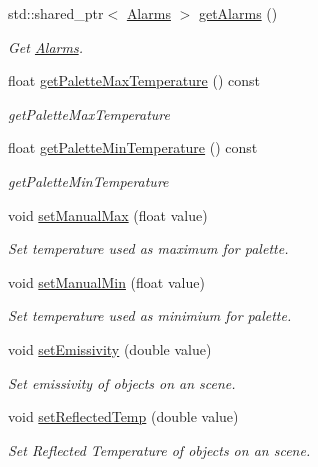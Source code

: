 \begin{DoxyCompactItemize}
std\+::shared\+\_\+ptr$<$ \hyperlink{classwtl_1_1_alarms}{Alarms} $>$ \hyperlink{classwtl_1_1_sequence_radiometric_a11b13d272a8674a3cdccfeb2ed3400fe}{get\+Alarms} ()
\begin{DoxyCompactList}\small\item\em Get \hyperlink{classwtl_1_1_alarms}{Alarms}. \end{DoxyCompactList}\item 
float \hyperlink{classwtl_1_1_sequence_radiometric_a3e944251c9a88be6f5b8cf5f41ffd462}{get\+Palette\+Max\+Temperature} () const
\begin{DoxyCompactList}\small\item\em get\+Palette\+Max\+Temperature \end{DoxyCompactList}\item 
float \hyperlink{classwtl_1_1_sequence_radiometric_a18e8bdc19c4d9e8794653da24db46b70}{get\+Palette\+Min\+Temperature} () const
\begin{DoxyCompactList}\small\item\em get\+Palette\+Min\+Temperature \end{DoxyCompactList}\item 
void \hyperlink{classwtl_1_1_sequence_radiometric_a7d1489f923aeffa694826ea063724251}{set\+Manual\+Max} (float value)
\begin{DoxyCompactList}\small\item\em Set temperature used as maximum for palette. \end{DoxyCompactList}\item 
void \hyperlink{classwtl_1_1_sequence_radiometric_ad5fc50b7c210bc5d2a914ba1c0b47a3c}{set\+Manual\+Min} (float value)
\begin{DoxyCompactList}\small\item\em Set temperature used as minimium for palette. \end{DoxyCompactList}\item 
void \hyperlink{classwtl_1_1_sequence_radiometric_a3faab55fbc056ae2a50f690d78588095}{set\+Emissivity} (double value)
\begin{DoxyCompactList}\small\item\em Set emissivity of objects on an scene. \end{DoxyCompactList}\item 
void \hyperlink{classwtl_1_1_sequence_radiometric_aead15ea790587175b1db26a0859cc51d}{set\+Reflected\+Temp} (double value)
\begin{DoxyCompactList}\small\item\em Set Reflected Temperature of objects on an scene. \end{DoxyCompactList}\item 

\end{DoxyCompactItemize}
